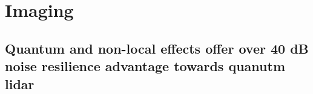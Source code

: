 \documentclass[../../note.tex]{subfiles}
\begin{document}
\chapter{Imaging}
\section{Quantum and non-local effects offer over 40 dB noise resilience advantage towards quanutm lidar}
 
\end{document}
